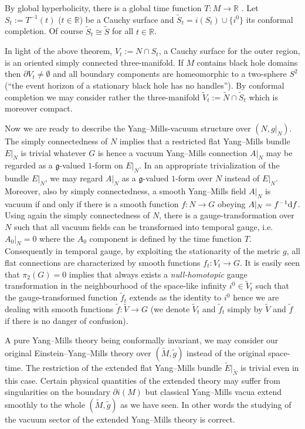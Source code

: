 \documentclass[a4paper,12pt,draft]{article}
\newcommand{\R}{{\mathbb R}}
\newcommand{\g}{{\mathfrak g}}
\newcommand{\dd}{{\rm d}}
\begin{document}
\noindent By global hyperbolicity, there is a global time function $T:
M\rightarrow\R$ . Let $S_t:=T^{-1}(t)$ ($t\in\R$) be a Cauchy surface and
$\widetilde{S}_t=i(S_t)\cup\{ i^0\}$ its conformal completion. Of course
$\widetilde{S}_t\cong\widetilde{S}$ for all $t\in\R$.

In light of the above theorem, $V_t:=N\cap S_t$, a Cauchy surface for the
outer region, is
an oriented simply connected three-manifold. If $M$ contains black hole
domains then $\partial V_t\not=\emptyset$  and all boundary components
are homeomorphic to a two-sphere $S^2$ (``the event horizon of a
stationary black hole has no handles''). By conformal completion we may
consider rather the three-manifold
$\widetilde{V}_t:=\widetilde{N}\cap\widetilde{S}_t$ which is
moreover compact. 

Now we are ready to describe the Yang--Mills-vacuum structure over $(N,
g\vert_N)$. The simply connectedness of $N$ implies that a restricted
flat Yang--Mills bundle $E\vert_N$ is trivial whatever $G$ is hence a
vacuum Yang--Mills connection $A\vert_N$ may be regarded as a $\g$-valued
$1$-form on $E\vert_N$. In an appropriate trivialization of the bundle
$E\vert_N$, we may regard $A\vert_N$ as a $\g$-valued $1$-form over $N$
instead of $E\vert_N$. Moreover, also by simply connectedness, a smooth
Yang--Mills field $A\vert_N$ is vacuum if and only if there is a
smooth function $f:N\rightarrow G$ obeying $A\vert_N=f^{-1}\dd f$. Using
again the simply connectedness of $N$, there is a gauge-transformation
over $N$ such that all vacuum fields can be transformed into temporal
gauge, i.e. $A_0\vert_N=0$ where the $A_0$ component is defined by the
time function $T$. Consequently in temporal gauge, by exploiting the
stationarity of the metric $g$, all flat connections are characterized by
smooth functions $f_t: V_t\rightarrow G$. It is easily seen that
$\pi_2(G)=0$ implies that always
exists a {\it null-homotopic} gauge transformation in the neighbourhood of
the space-like infinity $i^0\in\widetilde{V}_t$ such that the
gauge-transformed function $\tilde{f}_t$ extends as the identity to
$i^0$ hence we are dealing with smooth functions
$\tilde{f}:\widetilde{V}\rightarrow G$ (we denote $\widetilde{V}_t$ and
$\tilde{f}_t$ simply by $\widetilde{V}$ and $\tilde{f}$ if there is no
danger of confusion).

A pure Yang--Mills theory being conformally invariant, we may consider
our original Ein\-stein--Yang--Mills theory over $(\widetilde{M},
\widetilde{g})$ instead of the original space-time. The
restriction of the extended flat Yang--Mills bundle $\widetilde{E}
\vert_{\widetilde{N}}$ is trivial even in this case. Certain physical
quantities of the extended theory may suffer from singularities on the
boundary $\partial i(M)$ but classical Yang--Mills vacua extend smoothly
to the whole $(\widetilde{M}, \widetilde{g})$ as we have seen. In other
words the studying of the vacuum sector of the extended Yang--Mills theory
is correct.
\end{document}

